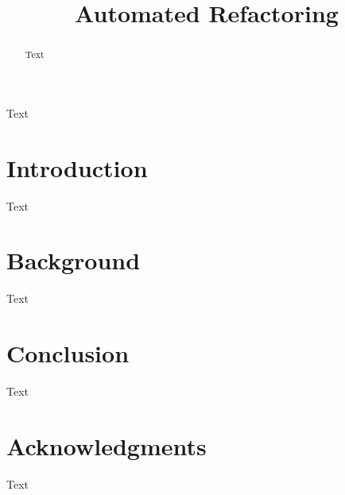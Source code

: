 \documentclass[journal]{IEEEtran}
\begin{document}
\title{Automated Refactoring}


\author{


}


\maketitle


\begin{abstract}
	
Text

\end{abstract}

\begin{IEEEkeywords}
Text
\end{IEEEkeywords}

%
\IEEEpeerreviewmaketitle


\section{Introduction}

Text \cite{polymorphism}

\section{Background}

Text

\section{Conclusion}

Text

\section*{Acknowledgments}

Text




\balance

\end{document}
